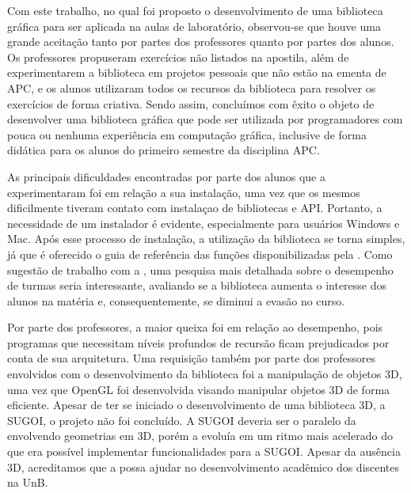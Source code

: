 

Com este trabalho, no qual foi proposto o desenvolvimento de uma biblioteca gráfica para ser aplicada na aulas de laboratório, observou-se que houve uma grande aceitação tanto por partes dos professores quanto por partes dos alunos. Os professores propuseram exercícios não listados na apostila, além de experimentarem a biblioteca em projetos pessoais que não estão na ementa de \acrshort{APC}, e os alunos utilizaram todos os recursos da biblioteca para resolver os exercícios de forma criativa. Sendo assim, concluímos com êxito o objeto de desenvolver uma biblioteca gráfica que pode ser utilizada por programadores com pouca ou nenhuma experiência em computação gráfica, inclusive de forma didática para os alunos do primeiro semestre da disciplina \acrshort{APC}.

As  principais dificuldades encontradas  por parte
dos alunos que  a experimentaram foi em relação  a sua instalação, uma
vez  que os  mesmos  dificilmente tiveram  contato  com instalaçao  de
bibliotecas  e  \acrshort{API}.  Portanto,  a  necessidade  de  um instalador  é
evidente, especialmente para usuários  Windows e Mac.  Após esse processo de
instalação, a utilização da biblioteca se torna simples, já que é oferecido o
guia de referência das funções disponibilizadas pela \playAPC. Como sugestão de trabalho com a \playAPC{}, uma pesquisa mais detalhada sobre o desempenho de turmas seria interessante, avaliando se a biblioteca aumenta o interesse dos alunos na matéria e, consequentemente, se diminui a evasão no curso.

Por  parte  dos  professores,  a   maior  queixa  foi  em  relação  ao
desempenho, pois programas que necessitam níveis profundos de recursão
ficam  prejudicados por conta de sua arquitetura.  Uma  requisição também por
parte dos  professores envolvidos com  o desenvolvimento da biblioteca  foi a
manipulação de objetos 3D, uma vez que OpenGL foi desenvolvida visando
manipular objetos 3D de forma eficiente. Apesar de ter se iniciado o desenvolvimento de uma biblioteca 3D, a \acrfull{SUGOI}, o projeto não foi concluído. A \acrshort{SUGOI} deveria ser o paralelo da \playAPC{} envolvendo geometrias em 3D, porém a \playAPC{} evoluía em um ritmo mais acelerado do que era possível implementar funcionalidades para a \acrshort{SUGOI}.
Apesar da ausência 3D,
acreditamos que a \playAPC{} possa ajudar no desenvolvimento acadêmico
dos discentes na \textsf{UnB}.